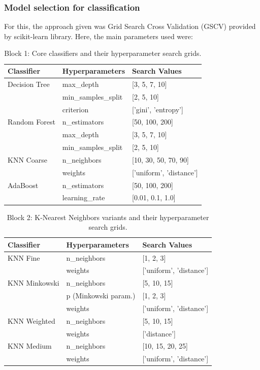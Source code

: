 \documentclass[9pt]{beamer}
\begin{document}
  \begin{frame}[allowframebreaks]
    \frametitle{Model selection for classification}
    For this, the approach given was Grid Search Cross Validation (GSCV)
    provided by scikit-learn library.
    Here, the main parameters used were:
    \begin{table}[htbp]
      \scriptsize
      \centering
      \caption{Block 1: Core classifiers and their hyperparameter search grids.}
      \label{tab:block1}
      \begin{tabular}{@{}l L l@{}}
      \toprule
      \textbf{Classifier} & \textbf{Hyperparameters} & \textbf{Search Values} \\
      \midrule
      Decision Tree & max\_depth & [3, 5, 7, 10] \\
      & min\_samples\_split & [2, 5, 10] \\
      & criterion & ['gini', 'entropy'] \\
      \midrule
      Random Forest & n\_estimators & [50, 100, 200] \\
      & max\_depth & [3, 5, 7, 10] \\
      & min\_samples\_split & [2, 5, 10] \\
      \midrule
      KNN Coarse & n\_neighbors & [10, 30, 50, 70, 90] \\
      & weights & ['uniform', 'distance'] \\
      \midrule
      AdaBoost & n\_estimators & [50, 100, 200] \\
      & learning\_rate & [0.01, 0.1, 1.0] \\
      \bottomrule
      \end{tabular}
    \end{table}

    \begin{table}[htbp]
      \scriptsize
      \centering
      \caption{Block 2: K-Nearest Neighbors variants and their hyperparameter search grids.}
      \label{tab:block2}
      \begin{tabular}{@{}l L l@{}}
      \toprule
      \textbf{Classifier} & \textbf{Hyperparameters} & \textbf{Search Values} \\
      \midrule
      KNN Fine & n\_neighbors & [1, 2, 3] \\
      & weights & ['uniform', 'distance'] \\
      \midrule
      KNN Minkowski & n\_neighbors & [5, 10, 15] \\
      & p (Minkowski param.) & [1, 2, 3] \\
      & weights & ['uniform', 'distance'] \\
      \midrule
      KNN Weighted & n\_neighbors & [5, 10, 15] \\
      & weights & ['distance'] \\
      \midrule
      KNN Medium & n\_neighbors & [10, 15, 20, 25] \\
      & weights & ['uniform', 'distance'] \\
      \bottomrule
      \end{tabular}
    \end{table}


\end{frame}
\end{document}
